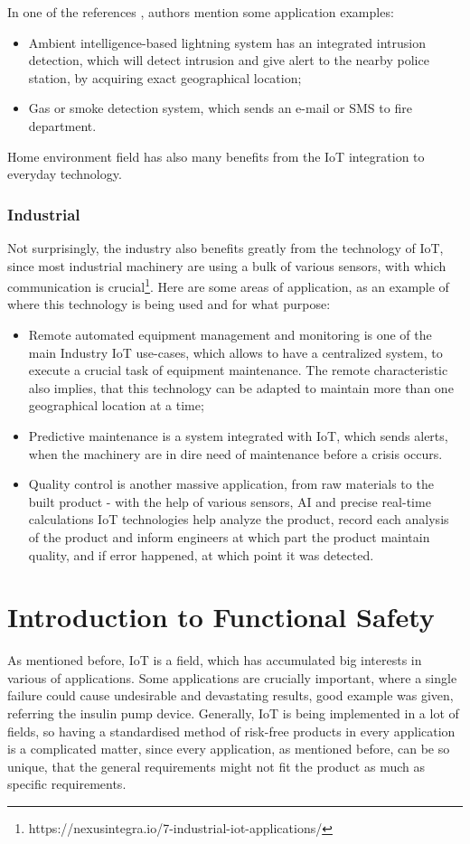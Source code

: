 \documentclass[conference]{IEEEtran}
\begin{document}
In one of the references \cite{ramson_applications_2020}, authors mention some application examples:

\begin{itemize}
    \item Ambient intelligence-based lightning system has an integrated intrusion detection, which will detect intrusion and give alert to the nearby police station, by acquiring exact geographical location;
    \item Gas or smoke detection system, which sends an e-mail or SMS to fire department.
\end{itemize}

Home environment field has also many benefits from the IoT integration to everyday technology.

\subsubsection{Industrial}

Not surprisingly, the industry also benefits greatly from the technology of IoT, since most industrial machinery are using a bulk of various sensors, with which communication is crucial\footnote{https://nexusintegra.io/7-industrial-iot-applications/}. Here are some areas of application, as an example of where this technology is being used and for what purpose:

\begin{itemize}
    \item Remote automated equipment management and monitoring is one of the main Industry IoT use-cases, which allows to have a centralized system, to execute a crucial task of equipment maintenance. The remote characteristic also implies, that this technology can be adapted to maintain more than one geographical location at a time;
    \item Predictive maintenance is a system integrated with IoT, which sends alerts, when the machinery are in dire need of maintenance before a crisis occurs.
    \item Quality control is another massive application, from raw materials to the built product - with the help of various sensors, AI and precise real-time calculations IoT technologies help analyze the product, record each analysis of the product and inform engineers at which part the product maintain quality, and if error happened, at which point it was detected.
\end{itemize}
\section{Introduction to Functional Safety}
As mentioned before, IoT is a field, which has accumulated big interests in various of applications. Some applications are crucially important, where a single failure could cause undesirable and devastating results, good example was given, referring the insulin pump device. Generally, IoT is being implemented in a lot of fields, so having a standardised method of risk-free products in every application is a complicated matter, since every application, as mentioned before, can be so unique, that the general requirements might not fit the product as much as specific requirements.
\end{document}
